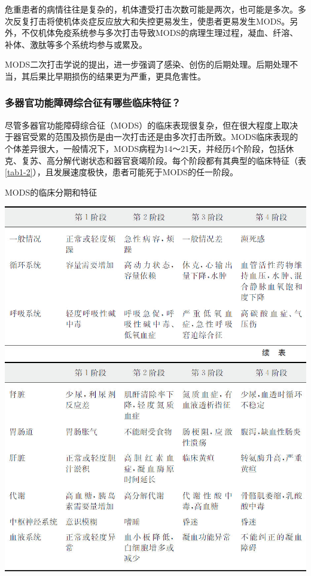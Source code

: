 危重患者的病情往往是复杂的，机体遭受打击次数可能是两次，也可能是多次。多次反复打击将使机体炎症反应放大和失控更易发生，使患者更易发生MODS。另外，不仅机体免疫系统参与多次打击导致MODS的病理生理过程，凝血、纤溶、补体、激肽等多个系统均参与或累及。

MODS二次打击学说的提出，进一步强调了感染、创伤的后期处理。后期处理不当，其后果比早期损伤的结果更为严重，更具危害性。

\subsubsection{多器官功能障碍综合征有哪些临床特征？}

尽管多器官功能障碍综合征（MODS）的临床表现很复杂，但在很大程度上取决于器官受累的范围及损伤是由一次打击还是由多次打击所致。MODS临床表现的个体差异很大，一般情况下，MODS病程为14～21天，并经历4个阶段，包括休克、复苏、高分解代谢状态和器官衰竭阶段。每个阶段都有其典型的临床特征（表\ref{tab1-2}），且发展速度极快，患者可能死于MODS的任一阶段。

\begin{table}[htbp]
\centering
\caption{MODS的临床分期和特征}
\label{tab1-2}
\includegraphics[width=\textwidth,height=\textheight,keepaspectratio]{./images/Image00004.jpg}
\includegraphics[width=\textwidth,height=\textheight,keepaspectratio]{./images/Image00005.jpg}
\end{table}




